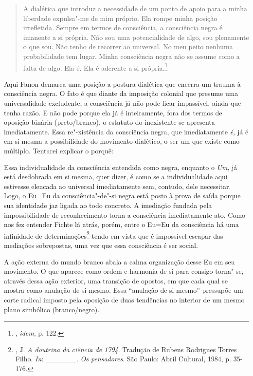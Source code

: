 \begin{quote}
A dialética que introduz a necessidade de um ponto de apoio para a minha
liberdade expulsa"-me de mim próprio. Ela rompe minha posição
irrefletida. Sempre em termos de consciência, a consciência negra é
imanente a si própria. Não sou uma potencialidade de algo, sou
plenamente o que sou. Não tenho de recorrer ao universal. No meu peito
nenhuma probabilidade tem lugar. Minha consciência negra não se assume
como a falta de algo. Ela é. Ela é aderente a si própria.\footnote{,
  \emph{idem}, p. 122.}
\end{quote}

Aqui Fanon demarca uma posição a
postura dialética que encerra um trauma à consciência negra. O fato é
que diante da imposição colonial que presume uma universalidade
excludente, a consciência já não pode ficar impassível, ainda que tenha
razão. E não pode porque ela já é inteiramente, fora dos termos de
oposição binária (preto/branco), o estatuto do inexistente se apresenta
imediatamente. Essa re"-xistência da consciência negra, que imediatamente
\emph{é,} já é em si mesma a possibilidade do movimento dialético, o ser
um que existe como múltiplo. Tentarei explicar o porquê:

Essa individualidade da consciência entendida como negra, enquanto o
\emph{Um}, já está desdobrada em si mesma, quer dizer, é como se a
individualidade aqui estivesse elencada ao universal imediatamente sem,
contudo, dele necessitar. Logo, o Eu=Eu da consciência"-de"-si negra está
posto à prova de saída porque sua identidade jaz ligada ao todo
concreto. A imediação fundada pela impossibilidade de reconhecimento
torna a consciência imediatamente ato. Como nos fez entender Fichte lá
atrás, porém, entre o Eu=Eu da consciência há uma infinidade de
determinações\footnote{, J. \emph{A doutrina da ciência de 1794}.
  Tradução de Rubens Rodrigues Torres Filho. \emph{In}:
  \_\_\_\_\_\_. \emph{Os pensadores}. São Paulo: Abril Cultural, 1984, p. 35-176.}
tendo em vista que é impossível escapar das mediações sobrepostas, uma
vez que essa consciência é ser social.

A ação externa do mundo branco abala a calma organização desse Eu em seu
movimento. O que aparece como ordem e harmonia de si para consigo
torna"-se, através dessa ação exterior, uma transição de opostos, em que
cada qual se mostra como anulação de si mesmo. Essa ``anulação de si
mesmo'' pressupõe um corte radical imposto pela oposição de duas
tendências no interior de um mesmo plano simbólico (branco/negro).


